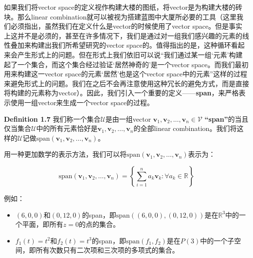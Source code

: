 \documentclass{report}
\def\R{\mathbb{R}}
\def\defb{\begin{tcolorbox} [colback=yellow!20, colframe=orange!80, sharp corners, leftrule={5pt}, rightrule={0pt}, toprule={0pt}, bottomrule={0pt}, left={2pt}, right={2pt}, top={3pt}, bottom={3pt}]}
\def\defe{\end{tcolorbox}}
\def\egb{\begin{tcolorbox} [colback=blue!20, colframe=blue!80, sharp corners, leftrule={5pt}, rightrule={0pt}, toprule={0pt}, bottomrule={0pt}, left={2pt}, right={2pt}, top={3pt}, bottom={3pt}]}
\def\ege{\end{tcolorbox}}
\def\V{\mathcal{V}}
\def\U{\mathcal{U}}
\def\v{\mathbf{v}}
\def\span{\text{span}}
\begin{document}
如果我们将vector space的定义视作构建大楼的图纸，将vector是为构建大楼的砖块。那么linear combination就可以被视为搭建蓝图中大厦所必要的工具（这里我们必须指出，虽然我们在定义什么是vector的时候使用了vector space。但是事实上这并不是必须的，甚至在许多情况下，我们是通过对一组我们感兴趣的元素的线性叠加来构建出我们所希望研究的vector space的。值得指出的是，这种循环看起来会产生形式上的问题。但在形式上我们依旧可以说“我们通过某一组‘元素’构建起了一个集合，而这个集合经过验证‘居然神奇的’是一个vector space。而我们最初用来构建这一vector space的元素‘居然’也是这个vector space中的元素”这样的过程来避免形式上的问题。我们在之后不会再注意使用这种冗长的避免方式，而是直接将构建的元素称为vector）。因此，我们引入一个重要的定义——\textbf{span}，来严格表示使用一组vector来生成一个vector space的过程。

\defb
	\textbf{Definition 1.7}
	我们称一个集合$\U$是由一组vector $\v_1,\v_2,\dots,\v_n \in \V$ \textbf{“span”}的当且仅当集合$\U$中的所有元素恰好是$\v_1,\v_2,\dots,\v_n$的全部linear combination。我们将这样的$\U$记做$\span(\v_1,\v_2,\dots,\v_n)$。

	用一种更加数学的表示方法，我们可以将$\span(\v_1,\v_2,\dots,\v_n)$表示为：

	$$ \span(\v_1,\v_2,\dots,\v_n) = \left\{ \sum_{i=1}^{n} a_k \v_k : \forall a_k \in \R \right\} $$
\defe

\egb
例如：

\begin{itemize}

\item  $(6,0,0)$和$(0,12,0)$的span，即$\span((6,0,0),(0,12,0))$是在$\R^3$中的一个平面，即所有$z=0$的点的集合。


\item $f_1(t) = t^2$和$f_2(t) = t^3$的span，即$\span(f_1,f_2)$是在$P(3)$中的一个子空间，即所有次数只有二次项和三次项的多项式的集合。

\end{itemize}

\ege 
\end{document}

